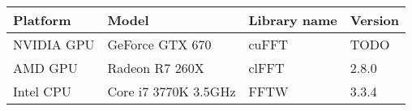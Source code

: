 \begin{tabular}{|l|l|l|l|}
	\hline
	Platform & Model & Library name & Version \\ \hline
	NVIDIA GPU & GeForce GTX 670 & cuFFT & TODO \\
	AMD GPU & Radeon R7 260X & clFFT & 2.8.0 \\ \hline
	Intel CPU & Core i7 3770K 3.5GHz & FFTW & 3.3.4 \\ \hline
\end{tabular}